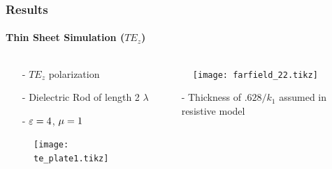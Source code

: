 \documentclass[mathserif,16pt,xcolor=table]{beamer}
\begin{document}
      \begin{frame}
        \frametitle{Results}
        \framesubtitle{Thin Sheet Simulation ($TE_z$)}
        \begin{columns}[T] %
          \begin{column}{.5\textwidth}
            \begin{itemize}
              \item[-]{$TE_z$ polarization}
              \item[-]{Dielectric Rod of length 2 $\lambda$}
              \item[-]{$\varepsilon = 4$, $\mu = 1$}
            \end{itemize}
            \begin{figure}
              \centering
              \texttt{[image: te\_plate1.tikz]}
              \label{fig:te_plate}
            \end{figure}
          \end{column}
          \begin{column}[T]{.5\textwidth}
            \begin{figure}
              \vspace*{-1cm}
              \texttt{[image: farfield\_22.tikz]}
              \label{fig:TE_rcs}
            \end{figure}
            \begin{itemize}
              \item[-]{Thickness of $.628/k_1$ assumed in resistive model}
            \end{itemize}
            \end{column}%
        \end{columns}
      \end{frame}
\end{document}
